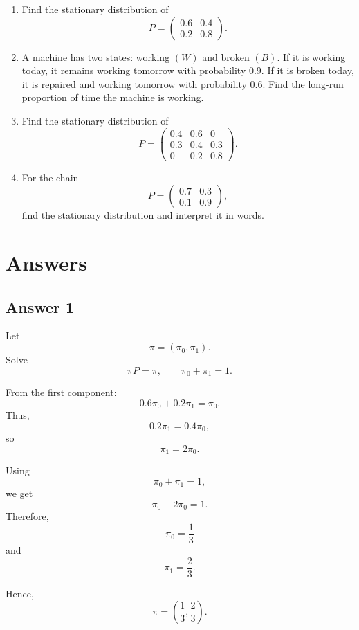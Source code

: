 \documentclass[12pt,a4paper]{article}
\theoremstyle{notestyle}
\begin{document}
\begin{enumerate}[label=\textbf{Q\arabic*.}, leftmargin=1.2cm]
    \item Find the stationary distribution of
    \[
    P=
    \begin{pmatrix}
    0.6 & 0.4\\
    0.2 & 0.8
    \end{pmatrix}.
    \]

    \item A machine has two states: working $(W)$ and broken $(B)$. If it is working today, it remains working tomorrow with probability $0.9$. If it is broken today, it is repaired and working tomorrow with probability $0.6$. Find the long-run proportion of time the machine is working.

    \item Find the stationary distribution of
    \[
    P=
    \begin{pmatrix}
    0.4 & 0.6 & 0\\
    0.3 & 0.4 & 0.3\\
    0 & 0.2 & 0.8
    \end{pmatrix}.
    \]

    \item For the chain
    \[
    P=
    \begin{pmatrix}
    0.7 & 0.3\\
    0.1 & 0.9
    \end{pmatrix},
    \]
    find the stationary distribution and interpret it in words.
\end{enumerate}

\section{Answers}

\subsection*{Answer 1}

Let
\[
\pi=(\pi_0,\pi_1).
\]
Solve
\[
\pi P=\pi,
\qquad
\pi_0+\pi_1=1.
\]

From the first component:
\[
0.6\pi_0+0.2\pi_1=\pi_0.
\]
Thus,
\[
0.2\pi_1=0.4\pi_0,
\]
so
\[
\pi_1=2\pi_0.
\]

Using
\[
\pi_0+\pi_1=1,
\]
we get
\[
\pi_0+2\pi_0=1.
\]
Therefore,
\[
\pi_0=\frac13
\]
and
\[
\pi_1=\frac23.
\]

Hence,
\[
\boxed{\pi=\left(\frac13,\frac23\right).}
\]
\end{document}

